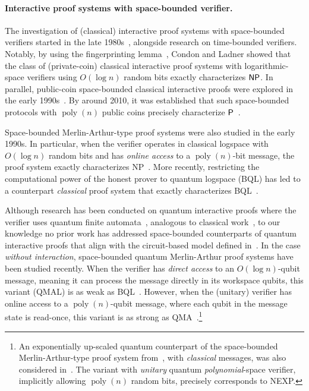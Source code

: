 \documentclass[11pt, a4paper]{article}
\numberwithin{equation}{section}
\numberwithin{figure}{section}
\newcommand{\Ptime}{\textnormal{\textsf{P}}\xspace}
\newcommand{\NP}{\textnormal{\textsf{NP}}\xspace}
\newcommand{\NEXP}{\textnormal{\textsf{NEXP}}\xspace}
\newcommand{\QMA}{\textnormal{\textsf{QMA}}\xspace}
\newcommand{\QMAL}{\textnormal{\textsf{QMAL}}\xspace}
\newcommand{\BQL}{\textnormal{\textsf{BQL}}\xspace}
\DeclareMathOperator\poly{poly}
\begin{document}
\paragraph{Interactive proof systems with space-bounded verifier.}
The investigation of (classical) interactive proof systems with space-bounded verifiers started in the late 1980s~\cite{DS89,Condon91}, alongside research on time-bounded verifiers. 
Notably, by using the fingerprinting lemma~\cite{Lipton90}, Condon and Ladner \cite{CL95} showed that the class of (private-coin) classical interactive proof systems with logarithmic-space verifiers using $O(\log{n})$ random bits exactly characterizes $\NP$. 
In parallel, public-coin space-bounded classical interactive proofs were explored in the early 1990s~\cite{Fortnow89,FL93,Condon92survey}. By around 2010, it was established that such space-bounded protocols with $\poly(n)$ public coins precisely characterize $\Ptime$~\cite{GKR15}. 

Space-bounded Merlin-Arthur-type proof systems were also studied in the early 1990s. In particular, when the verifier operates in classical logspace with $O(\log n)$ random bits and has \textit{online access} to a $\poly(n)$-bit message, the proof system exactly characterizes \NP{}~\cite{Lipton90}. 
More recently, restricting the computational power of the honest prover to quantum logspace (\BQL{}) has led to a counterpart \textit{classical} proof system that exactly characterizes \BQL{}~\cite{GRZ23}.

Although research has been conducted on quantum interactive proofs where the verifier uses quantum finite automata~\cite{NY09,NY15,Yaka13}, analogous to classical work~\cite{DS89}, to our knowledge no prior work has addressed space-bounded counterparts of quantum interactive proofs that align with the circuit-based model defined in~\cite{KW00, Wat99QIP}. In the case \textit{without interaction}, space-bounded quantum Merlin-Arthur proof systems have been studied recently. When the verifier has \textit{direct access} to an $O(\log n)$-qubit message, meaning it can process the message directly in its workspace qubits, this variant (\QMAL{}) is as weak as \BQL{}~\cite{FKLMN16,FR21}. However, when the (unitary) verifier has online access to a $\poly(n)$-qubit message, where each qubit in the message state is read-once, this variant is as strong as \QMA{}~\cite{GR23online}.\footnote{An exponentially up-scaled quantum counterpart of the space-bounded Merlin-Arthur-type proof system from~\cite{Lipton90}, with \textit{classical} messages, was also considered in~\cite{GR23online}. The variant with \textit{unitary} quantum \textit{polynomial}-space verifier, implicitly allowing $\poly(n)$ random bits, precisely corresponds to \NEXP{}.\label{footref:streaming-proof}}
\end{document}
